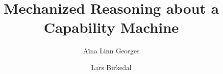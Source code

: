 \documentclass[sigplan,review]{acmart}\settopmatter{printfolios=true,printccs=false,printacmref=false}
\begin{document}
\title[Short Title]{Mechanized Reasoning about a Capability Machine}



\author{A{\"i}na Linn Georges}


\author{Lars Birkedal}
\end{document}
